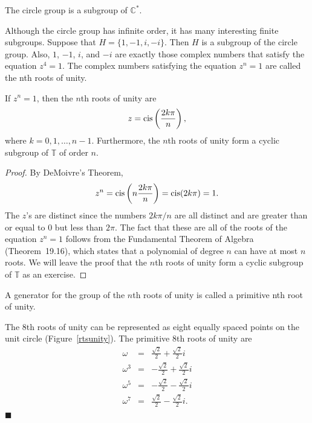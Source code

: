  
\begin{proposition}
The circle group is a subgroup of  ${\mathbb C}^*$.
\end{proposition}
 
 
Although the circle group has infinite order, it has many interesting 
finite subgroups. Suppose that $H = \{ 1, -1, i, -i \}$. Then $H$ is a
subgroup of the circle group. Also, $1$, $-1$, $i$, and $-i$ are
exactly those complex numbers that satisfy the equation $z^4=1$. 
The complex numbers satisfying the equation $z^n=1$ are called
the {\bfi nth roots of unity}. 
 
 
\begin{theorem}
If $z^n = 1$, then the $n$th roots of unity are
$$
z = \operatorname{cis} \left( \frac{2 k \pi}{n } \right),
$$
where $k = 0, 1, \ldots, n-1$. Furthermore, the $n$th roots of unity
form a cyclic subgroup of\/ ${\mathbb T}$ of order $n$. 
\end{theorem}
 
 
\begin{proof}
By DeMoivre's Theorem,
$$
z^n = \operatorname{cis} \left( n \frac{2 k \pi}{n } \right) =
\operatorname{cis}( 2 k \pi ) = 1.
$$
The $z$'s are distinct since the numbers $2 k \pi /n$ are all
distinct and are greater than or equal to 0 but less than $2 \pi$.
The fact that these are all of the roots of the equation $z^n=1$
follows from the Fundamental Theorem of Algebra (Theorem~19.16), which
states that a polynomial of degree $n$ can have at most $n$ roots.  We
will leave the proof that the $n$th roots of unity form a cyclic
subgroup of ${\mathbb T}$ as an exercise.
\end{proof}
 
 
\vspace{2ex}
 
 
A generator for the group of the $n$th roots of unity is called a
{\bfi primitive nth root of unity}. 
 
 
\vspace{2ex}
 
 
The 8th roots of unity can be represented as
eight equally spaced points on the unit circle (Figure~\ref{rtsunity}).  The
primitive 8th roots of unity are
\begin{eqnarray*}
\omega & = & \frac{\sqrt{2}}{2}  + \frac{\sqrt{2}}{2} i \\
\omega^3 & = & -\frac{\sqrt{2}}{2}  + \frac{\sqrt{2}}{2} i \\
\omega^5 & = & -\frac{\sqrt{2}}{2}  - \frac{\sqrt{2}}{2} i \\
\omega^7 & = & \frac{\sqrt{2}}{2}  - \frac{\sqrt{2}}{2}i. 
\end{eqnarray*}
\hspace{\fill} $\blacksquare$
 
